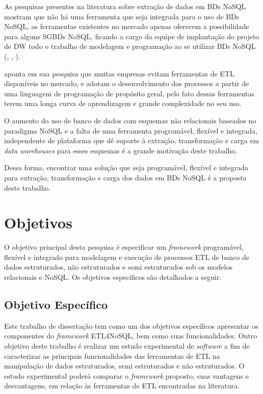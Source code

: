 As pesquisas presentes na literatura sobre extração de dados em BDs NoSQL mostram que não há uma ferramenta que seja integrada para o uso de BDs NoSQL, as ferramentas existentes no mercado apenas oferecem a possibilidade para alguns \acp{SGBD} NoSQL, ficando a cargo da equipe de implantação do projeto de DW todo o trabalho de modelagem e programação ao se utilizar BDs NoSQL (\cite{silva:2016}, \cite{chevalier:2015}, \cite{liu:2013}).

\cite{silva:2012} aponta em sua pesquisa que muitas empresas evitam ferramentas de ETL disponíveis no mercado, e adotam o desenvolvimento dos processos a partir de uma linguagem de programação de propósito geral, pelo fato dessas ferramentas terem uma longa curva de aprendizagem e grande complexidade no seu uso.

O aumento do uso de banco de dados com esquemas não relacionais baseados no paradigma NoSQL e a falta de uma ferramenta programável, flexível e integrada, independente de plataforma que dê suporte à extração, transformação e carga em \textit{data warehouses} para esses esquemas é a grande motivação deste trabalho.

Dessa forma, encontrar uma solução que seja programável, flexível e integrada para extração, transformação e carga dos dados em BDs NoSQL é a proposta deste trabalho.





\section{Objetivos}

O objetivo principal desta pesquisa é especificar um \textit{framework} programável, flexível e integrado para modelagem e execução de processos ETL de banco de dados estruturados, não estruturados e semi estruturados sob os modelos relacionais e NoSQL. Os objetivos específicos são detalhados a seguir.

\subsection{Objetivo Específico}

Este trabalho de dissertação tem como um dos objetivos específicos apresentar os componentes do \textit{framework} ETL4NoSQL, bem como suas funcionalidades. Outro objetivo deste trabalho é realizar um estudo experimental de \textit{software} a fim de caracterizar as principais funcionalidades das ferramentas de ETL na manipulação de dados estruturados, semi estruturados e não estruturados. O estudo experimental poderá comparar o \textit{framework} proposto, suas vantagens e desvantagens, em relação às ferramentas de ETL encontradas na literatura.

